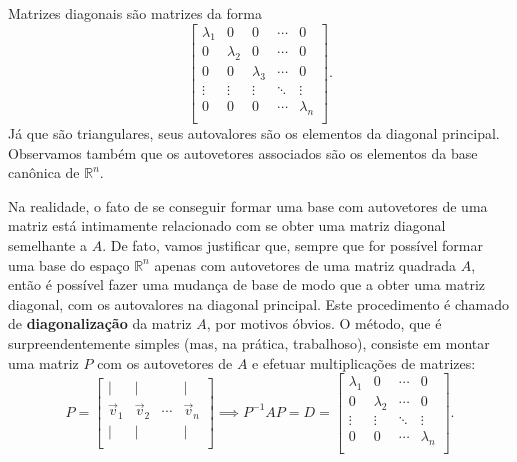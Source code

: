 \documentclass[../livro.tex]{subfiles}  %
\begin{document}
Matrizes diagonais são matrizes da forma
\begin{equation}
\begin{bmatrix}
\lambda_1 & 0 & 0 & \cdots & 0 \\
0 & \lambda_2 & 0 & \cdots & 0 \\
0 & 0 & \lambda_3 & \cdots & 0 \\
\vdots & \vdots & \vdots & \ddots & \vdots \\
0 & 0 & 0 & \cdots & \lambda_n \\
\end{bmatrix}.
\end{equation} Já que são triangulares, seus autovalores são os elementos da diagonal principal. Observamos também que os autovetores associados são os elementos da base canônica de $\mathbb{R}^n$.

Na realidade, o fato de se conseguir formar uma base com autovetores de uma matriz está intimamente relacionado com se obter uma matriz diagonal semelhante a $A$. De fato, vamos justificar que, sempre que for possível formar uma base do espaço $\mathbb{R}^n$ apenas com autovetores de uma matriz quadrada $A$, então é possível fazer uma mudança de base de modo que a obter uma matriz diagonal, com os autovalores na diagonal principal. Este procedimento é chamado de \textbf{diagonalização} da matriz $A$, por motivos óbvios. O método, que é surpreendentemente simples (mas, na prática, trabalhoso), consiste em montar uma matriz $P$ com os autovetores de $A$ e efetuar multiplicações de matrizes:
\begin{equation}
P = \begin{bmatrix}
| & | &  & | \\
\vec{v}_1 & \vec{v}_2 & \cdots & \vec{v}_n \\
| & | &  & |\\
\end{bmatrix} \implies P^{-1} A P = D = \begin{bmatrix}
\lambda_1 & 0  & \cdots & 0 \\
0 & \lambda_2  & \cdots & 0 \\
\vdots & \vdots & \ddots & \vdots \\
0 & 0 & \cdots & \lambda_n \\
\end{bmatrix}.
\end{equation}
\end{document}
